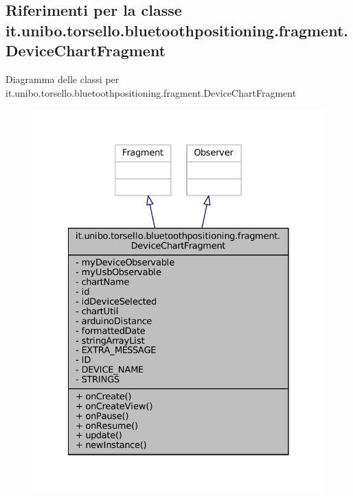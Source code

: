 \hypertarget{classit_1_1unibo_1_1torsello_1_1bluetoothpositioning_1_1fragment_1_1DeviceChartFragment}{}\subsection{Riferimenti per la classe it.\+unibo.\+torsello.\+bluetoothpositioning.\+fragment.\+Device\+Chart\+Fragment}
\label{classit_1_1unibo_1_1torsello_1_1bluetoothpositioning_1_1fragment_1_1DeviceChartFragment}


Diagramma delle classi per it.\+unibo.\+torsello.\+bluetoothpositioning.\+fragment.\+Device\+Chart\+Fragment
\nopagebreak
\begin{figure}[H]
\begin{center}
\leavevmode
\includegraphics[width=328pt]{classit_1_1unibo_1_1torsello_1_1bluetoothpositioning_1_1fragment_1_1DeviceChartFragment__inherit__graph}
\end{center}
\end{figure}


